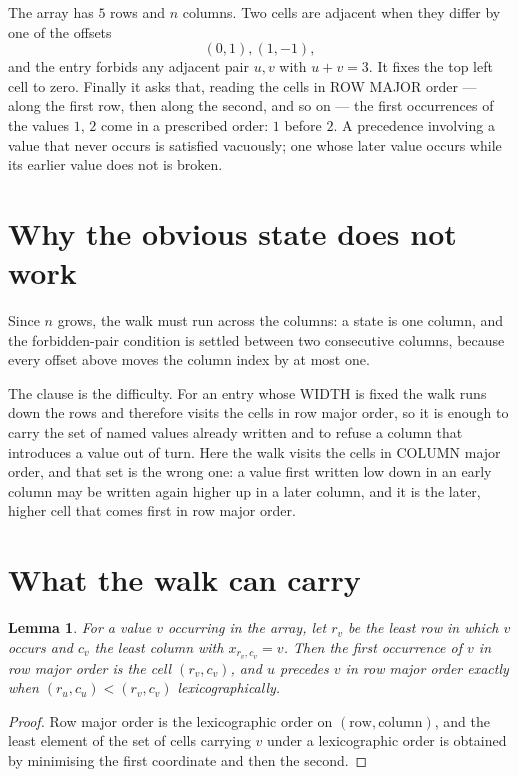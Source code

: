 \documentclass[11pt,a4paper]{article}
\theoremstyle{plain}
\newtheorem{lemma}[theorem]{Lemma}
\theoremstyle{definition}
\begin{document}
The array has $5$ rows and $n$ columns. Two cells are adjacent when they differ by one of the
offsets
\[
(0,1), (1,-1),
\]
and the entry forbids any adjacent pair $u,v$ with $u+v=3$. It fixes the top left cell to
zero. Finally it asks that, reading the cells in ROW MAJOR order --- along the first row, then
along the second, and so on --- the first occurrences of the values $1$, $2$ come in a
prescribed order: $1$ before $2$. A precedence involving a value that never occurs is satisfied
vacuously; one whose later value occurs while its earlier value does not is broken.

\section{Why the obvious state does not work}

Since $n$ grows, the walk must run across the columns: a state is one column, and the
forbidden-pair condition is settled between two consecutive columns, because every offset above
moves the column index by at most one.

The clause is the difficulty. For an entry whose WIDTH is fixed the walk runs down the rows and
therefore visits the cells in row major order, so it is enough to carry the set of named values
already written and to refuse a column that introduces a value out of turn. Here the walk
visits the cells in COLUMN major order, and that set is the wrong one: a value first written
low down in an early column may be written again higher up in a later column, and it is the
later, higher cell that comes first in row major order.

\section{What the walk can carry}

\begin{lemma}\label{lem:key}
For a value $v$ occurring in the array, let $r_v$ be the least row in which $v$ occurs and
$c_v$ the least column with $x_{r_v,c_v}=v$. Then the first occurrence of $v$ in row major
order is the cell $(r_v,c_v)$, and $u$ precedes $v$ in row major order exactly when
$(r_u,c_u)<(r_v,c_v)$ lexicographically.
\end{lemma}

\begin{proof}
Row major order is the lexicographic order on $(\text{row},\text{column})$, and the least
element of the set of cells carrying $v$ under a lexicographic order is obtained by minimising
the first coordinate and then the second.
\end{proof}
\end{document}
